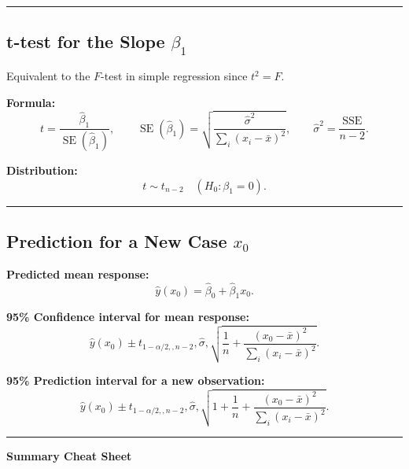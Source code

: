 \documentclass[
  letterpaper,
  DIV=11,
  numbers=noendperiod]{scrreprt}
\begin{document}
\begin{center}\rule{0.5\linewidth}{0.5pt}\end{center}

\subsection{\texorpdfstring{t-test for the Slope
\(\beta_1\)}{t-test for the Slope \textbackslash beta\_1}}\label{t-test-for-the-slope-beta_1}

Equivalent to the \(F\)-test in simple regression since \(t^2 = F\).

\textbf{Formula:} \[
t = \frac{\hat\beta_1}{\operatorname{SE}(\hat\beta_1)},
\qquad
\operatorname{SE}(\hat\beta_1) = \sqrt{\frac{\hat\sigma^2}{\sum_i (x_i - \bar x)^2}},
\qquad
\hat\sigma^2 = \frac{\mathrm{SSE}}{n-2}.
\]

\textbf{Distribution:} \[
t \sim t_{n-2}\quad (H_0:\beta_1=0).
\]

\begin{center}\rule{0.5\linewidth}{0.5pt}\end{center}

\subsection{\texorpdfstring{Prediction for a New Case
\(x_0\)}{Prediction for a New Case x\_0}}\label{prediction-for-a-new-case-x_0}

\textbf{Predicted mean response:} \[
\hat y(x_0) = \hat\beta_0 + \hat\beta_1 x_0.
\]

\textbf{95\% Confidence interval for mean response:} \[
\hat y(x_0) \pm t_{1-\alpha/2,,n-2},
\hat\sigma,\sqrt{\frac{1}{n} + \frac{(x_0 - \bar x)^2}{\sum_i (x_i - \bar x)^2}}.
\]

\textbf{95\% Prediction interval for a new observation:} \[
\hat y(x_0) \pm t_{1-\alpha/2,,n-2},
\hat\sigma,\sqrt{1 + \frac{1}{n} + \frac{(x_0 - \bar x)^2}{\sum_i (x_i - \bar x)^2}}.
\]

\begin{center}\rule{0.5\linewidth}{0.5pt}\end{center}

\textbf{Summary Cheat Sheet}
\end{document}

